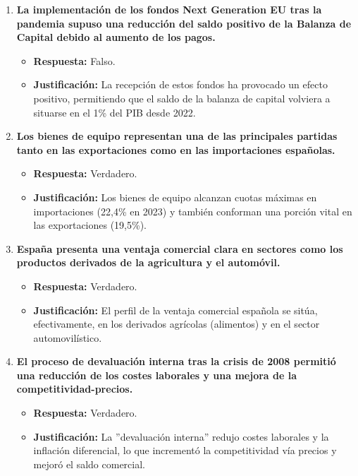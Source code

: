 \begin{enumerate}[label=\textbf{Pregunta \arabic*:}, leftmargin=*, itemsep=4ex]
\item \textbf{La implementación de los fondos Next Generation EU tras la pandemia supuso una reducción del saldo positivo de la Balanza de Capital debido al aumento de los pagos.}
    \begin{itemize}
        \item \textbf{Respuesta:} \textcolor{red!80!black}{Falso.}
        \item \textbf{Justificación:} La recepción de estos fondos ha provocado un efecto positivo, permitiendo que el saldo de la balanza de capital volviera a situarse en el 1\% del PIB desde 2022.
    \end{itemize}

\item \textbf{Los bienes de equipo representan una de las principales partidas tanto en las exportaciones como en las importaciones españolas.}
    \begin{itemize}
        \item \textbf{Respuesta:} \textcolor{blue!80!black}{Verdadero.}
        \item \textbf{Justificación:} Los bienes de equipo alcanzan cuotas máximas en importaciones (22,4\% en 2023) y también conforman una porción vital en las exportaciones (19,5\%).
    \end{itemize}

\item \textbf{España presenta una ventaja comercial clara en sectores como los productos derivados de la agricultura y el automóvil.}
    \begin{itemize}
        \item \textbf{Respuesta:} \textcolor{blue!80!black}{Verdadero.}
        \item \textbf{Justificación:} El perfil de la ventaja comercial española se sitúa, efectivamente, en los derivados agrícolas (alimentos) y en el sector automovilístico.
    \end{itemize}

\item \textbf{El proceso de devaluación interna tras la crisis de 2008 permitió una reducción de los costes laborales y una mejora de la competitividad-precios.}
    \begin{itemize}
        \item \textbf{Respuesta:} \textcolor{blue!80!black}{Verdadero.}
        \item \textbf{Justificación:} La ''devaluación interna'' redujo costes laborales y la inflación diferencial, lo que incrementó la competitividad vía precios y mejoró el saldo comercial.
    \end{itemize}


\end{enumerate}
